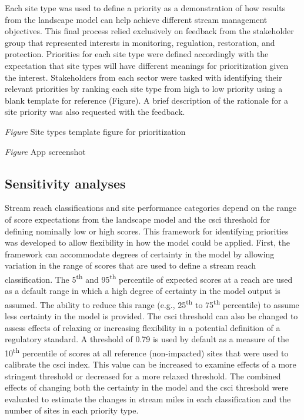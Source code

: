\documentclass[]{article}
\begin{document}
Each site type was used to define a priority as a demonstration of how
results from the landscape model can help achieve different stream
management objectives. This final process relied exclusively on feedback
from the stakeholder group that represented interests in monitoring,
regulation, restoration, and protection. Priorities for each site type
were defined accordingly with the expectation that site types will have
different meanings for prioritization given the interest. Stakeholders
from each sector were tasked with identifying their relevant priorities
by ranking each site type from high to low priority using a blank
template for reference (Figure). A brief description of the rationale
for a site priority was also requested with the feedback.

\emph{Figure} Site types template figure for prioritization

\emph{Figure} App screenshot

\subsection{Sensitivity analyses}\label{sensitivity-analyses}

Stream reach classifications and site performance categories depend on
the range of score expectations from the landscape model and the
\ac{csci} threshold for defining nominally low or high scores. This
framework for identifying priorities was developed to allow flexibility
in how the model could be applied. First, the framework can accommodate
degrees of certainty in the model by allowing variation in the range of
scores that are used to define a stream reach classification. The
5\textsuperscript{th} and 95\textsuperscript{th} percentile of expected
scores at a reach are used as a default range in which a high degree of
certainty in the model output is assumed. The ability to reduce this
range (e.g., 25\textsuperscript{th} to 75\textsuperscript{th}
percentile) to assume less certainty in the model is provided. The
\ac{csci} threshold can also be changed to assess effects of relaxing or
increasing flexibility in a potential definition of a regulatory
standard. A threshold of 0.79 is used by default as a measure of the
10\textsuperscript{th} percentile of scores at all reference
(non-impacted) sites that were used to calibrate the \ac{csci} index.
This value can be increased to examine effects of a more stringent
threshold or decreased for a more relaxed threshold. The combined
effects of changing both the certainty in the model and the \ac{csci}
threshold were evaluated to estimate the changes in stream miles in each
classification and the number of sites in each priority type.
\end{document}
